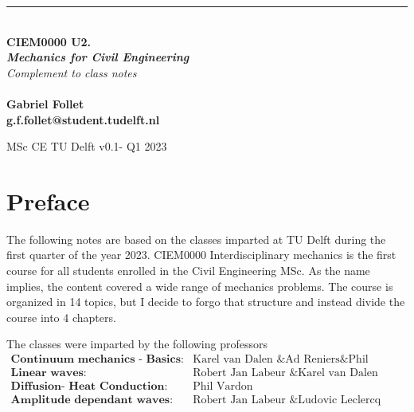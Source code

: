 \documentclass[a4paper, 11pt,article,oneside]{memoir}%
\begin{document}
\noindent
\setlength{\parindent}{0pt}

\begin{titlingpage}
	\raggedleft %
	{\color{magenta}\rule{3 pt}{\textheight}} %
	\hspace{0.05\textwidth} %
	\parbox[b]{0.9\textwidth}{ %
	
		{\\\Huge\bfseries{ CIEM0000 U2.\\
		\textit{Mechanics for Civil Engineering}}}\\[3\baselineskip]  %
		{\large\textit{Complement to class notes }}\\[4\baselineskip] %
      	\\[4\baselineskip] 
		{\color{magenta}\textbf{Gabriel Follet\\g.f.follet@student.tudelft.nl}}
		
		\vspace{0.25\textheight} %
			{\noindent MSc CE TU Delft  v0.1- Q1 2023}} %

\end{titlingpage}
\section*{Preface}
The following notes are based on the classes imparted at TU Delft during the first quarter of the year 2023.
CIEM0000 Interdisciplinary mechanics is the first course for all students enrolled in the Civil Engineering MSc.
 As the name implies, the content covered a wide range of mechanics problems. The course is organized in 14 topics, but I decide to forgo that structure and instead divide the course into 4 chapters.

The classes were imparted by the following professors
\begin{align*}
\textbf{Continuum mechanics - Basics: }&\text{Karel van Dalen \& Ad Reniers\&  Phil Vardon}\\
\textbf{Linear waves: }&\text{Robert Jan Labeur \& Karel van Dalen}\\
\textbf{Diffusion- Heat Conduction: }&\text{Phil Vardon}\\
\textbf{Amplitude dependant waves: }&\text{Robert Jan Labeur \& Ludovic Leclercq}
\end{align*} 
\end{document}
